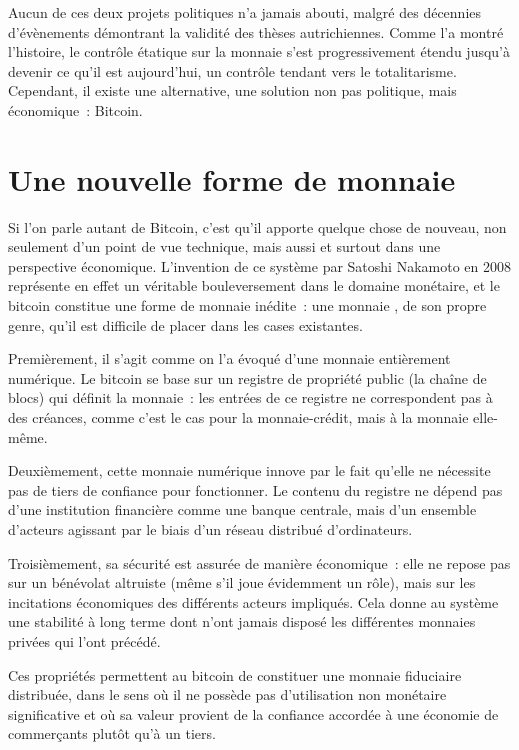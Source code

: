 Aucun de ces deux projets politiques n'a jamais abouti, malgré des décennies d'évènements démontrant la validité des thèses autrichiennes. Comme l'a montré l'histoire, le contrôle étatique sur la monnaie s'est progressivement étendu jusqu'à devenir ce qu'il est aujourd'hui, un contrôle tendant vers le totalitarisme. Cependant, il existe une alternative, une solution non pas politique, mais économique~: Bitcoin.

\section*{Une nouvelle forme de monnaie}

Si l'on parle autant de Bitcoin, c'est qu'il apporte quelque chose de nouveau, non seulement d'un point de vue technique, mais aussi et surtout dans une perspective économique. L'invention de ce système par Satoshi Nakamoto en 2008 représente en effet un véritable bouleversement dans le domaine monétaire, et le bitcoin constitue une forme de monnaie inédite~: une monnaie , de son propre genre, qu'il est difficile de placer dans les cases existantes.

Premièrement, il s'agit comme on l'a évoqué d'une monnaie entièrement numérique. Le bitcoin se base sur un registre de propriété public (la chaîne de blocs) qui définit la monnaie~: les entrées de ce registre ne correspondent pas à des créances, comme c'est le cas pour la monnaie-crédit, mais à la monnaie elle-même.

Deuxièmement, cette monnaie numérique innove par le fait qu'elle ne nécessite pas de tiers de confiance pour fonctionner. Le contenu du registre ne dépend pas d'une institution financière comme une banque centrale, mais d'un ensemble d'acteurs agissant par le biais d'un réseau distribué d'ordinateurs.

Troisièmement, sa sécurité est assurée de manière économique~: elle ne repose pas sur un bénévolat altruiste (même s'il joue évidemment un rôle), mais sur les incitations économiques des différents acteurs impliqués. Cela donne au système une stabilité à long terme dont n'ont jamais disposé les différentes monnaies privées qui l'ont précédé.

Ces propriétés permettent au bitcoin de constituer une monnaie fiduciaire distribuée, dans le sens où il ne possède pas d'utilisation non monétaire significative et où sa valeur provient de la confiance accordée à une économie de commerçants plutôt qu'à un tiers. %

